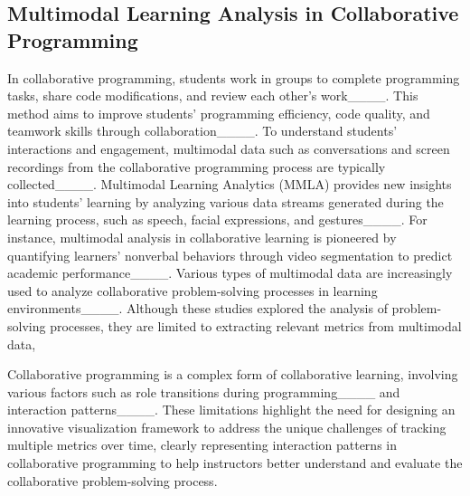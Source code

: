 \subsection{Multimodal Learning Analysis in Collaborative Programming}
In collaborative programming, students work in groups to complete programming tasks, share code modifications, and review each other's work____. 
This method aims to improve students' programming efficiency, code quality, and teamwork skills through collaboration____. 
To understand students' interactions and engagement, multimodal data such as conversations and screen recordings from the collaborative programming process are typically collected____.
Multimodal Learning Analytics (MMLA) provides new insights into students' learning by analyzing various data streams generated during the learning process, such as speech, facial expressions, and gestures____. 
For instance, multimodal analysis in collaborative learning is pioneered by quantifying learners' nonverbal behaviors through video segmentation to predict academic performance____.
Various types of multimodal data are increasingly used to analyze collaborative problem-solving processes in learning environments____. 
Although these studies explored the analysis of problem-solving processes, they are limited to extracting relevant metrics from multimodal data, 

Collaborative programming is a complex form of collaborative learning, involving various factors such as role transitions during programming____ and interaction patterns____. 
These limitations highlight the need for designing an innovative visualization framework to address the unique challenges of tracking multiple metrics over time, clearly representing interaction patterns in collaborative programming to help instructors better understand and evaluate the collaborative problem-solving process.

